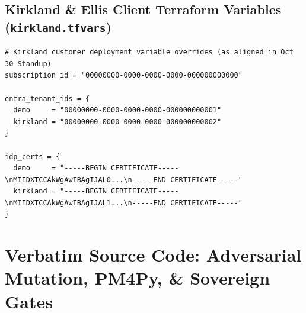 \documentclass[10pt,twoside,openany]{book}
\theoremstyle{plain}
\theoremstyle{definition}
\theoremstyle{remark}
\begin{document}
\section{Kirkland \& Ellis Client Terraform Variables (\texttt{kirkland.tfvars})}
\begin{lstlisting}[caption={infra/environments/dev/platform/kirkland.tfvars}]
# Kirkland customer deployment variable overrides (as aligned in Oct 30 Standup)
subscription_id = "00000000-0000-0000-0000-000000000000"

entra_tenant_ids = {
  demo     = "00000000-0000-0000-0000-000000000001"
  kirkland = "00000000-0000-0000-0000-000000000002"
}

idp_certs = {
  demo     = "-----BEGIN CERTIFICATE-----\nMIIDXTCCAkWgAwIBAgIJAL0...\n-----END CERTIFICATE-----"
  kirkland = "-----BEGIN CERTIFICATE-----\nMIIDXTCCAkWgAwIBAgIJAL1...\n-----END CERTIFICATE-----"
}

\end{lstlisting}

\chapter{Verbatim Source Code: Adversarial Mutation, PM4Py, \& Sovereign Gates}
\end{document}
